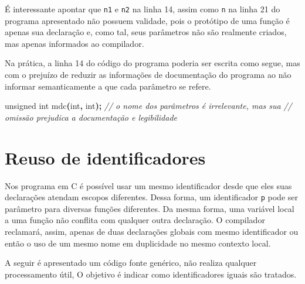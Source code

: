 \documentclass[
  11pt,
  a4paper,
]{scrbook}
\newenvironment{Shaded}{\begin{snugshade}}{\end{snugshade}}
\newcommand{\CommentTok}[1]{\textcolor[rgb]{0.56,0.35,0.01}{\textit{#1}}}
\newcommand{\DataTypeTok}[1]{\textcolor[rgb]{0.13,0.29,0.53}{#1}}
\newcommand{\NormalTok}[1]{#1}
\newcommand{\OperatorTok}[1]{\textcolor[rgb]{0.81,0.36,0.00}{\textbf{#1}}}
\begin{document}
\begin{tcolorbox}[enhanced jigsaw, arc=.35mm, bottomtitle=1mm, colbacktitle=quarto-callout-tip-color!10!white, title=\textcolor{quarto-callout-tip-color}{\faLightbulb}\hspace{0.5em}{Curiosidade}, toprule=.15mm, left=2mm, opacityback=0, colback=white, colframe=quarto-callout-tip-color-frame, opacitybacktitle=0.6, bottomrule=.15mm, leftrule=.75mm, toptitle=1mm, coltitle=black, titlerule=0mm, rightrule=.15mm, breakable]

É interessante apontar que \texttt{n1} e \texttt{n2} na linha 14, assim
como \texttt{n} na linha 21 do programa apresentado não possuem
validade, pois o protótipo de uma função é apenas sua declaração e, como
tal, seus parâmetros não são realmente criados, mas apenas informados ao
compilador.

Na prática, a linha 14 do código do programa poderia ser escrita como
segue, mas com o prejuízo de reduzir as informações de documentação do
programa ao não informar semanticamente a que cada parâmetro se refere.

\begin{Shaded}
\begin{Highlighting}[]
\DataTypeTok{unsigned} \DataTypeTok{int}\NormalTok{ mdc}\OperatorTok{(}\DataTypeTok{int}\OperatorTok{,} \DataTypeTok{int}\OperatorTok{);}  \CommentTok{// o nome dos parâmetros é irrelevante, mas sua}
                             \CommentTok{// omissão prejudica a documentação e legibilidade}
\end{Highlighting}
\end{Shaded}

\end{tcolorbox}

\section{Reuso de identificadores}\label{reuso-de-identificadores}

Nos programa em C é possível usar um mesmo identificador desde que eles
suas declarações atendam escopos diferentes. Dessa forma, um
identificador \texttt{p} pode ser parâmetro para diversas funções
diferentes. Da mesma forma, uma variável local a uma função não conflita
com qualquer outra declaração. O compilador reclamará, assim, apenas de
duas declarações globais com mesmo identificador ou então o uso de um
mesmo nome em duplicidade no mesmo contexto local.

A seguir é apresentado um código fonte genérico, não realiza qualquer
processamento útil, O objetivo é indicar como identificadores iguais são
tratados.
\end{document}
